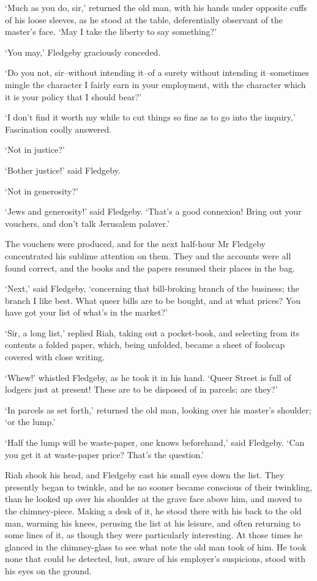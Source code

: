 ‘Much as you do, sir,’ returned the old man, with his hands under
opposite cuffs of his loose sleeves, as he stood at the table,
deferentially observant of the master’s face. ‘May I take the liberty to
say something?’

‘You may,’ Fledgeby graciously conceded.

‘Do you not, sir--without intending it--of a surety without intending
it--sometimes mingle the character I fairly earn in your employment,
with the character which it is your policy that I should bear?’

‘I don’t find it worth my while to cut things so fine as to go into the
inquiry,’ Fascination coolly answered.

‘Not in justice?’

‘Bother justice!’ said Fledgeby.

‘Not in generosity?’

‘Jews and generosity!’ said Fledgeby. ‘That’s a good connexion! Bring
out your vouchers, and don’t talk Jerusalem palaver.’

The vouchers were produced, and for the next half-hour Mr Fledgeby
concentrated his sublime attention on them. They and the accounts were
all found correct, and the books and the papers resumed their places in
the bag.

‘Next,’ said Fledgeby, ‘concerning that bill-broking branch of the
business; the branch I like best. What queer bills are to be bought, and
at what prices? You have got your list of what’s in the market?’

‘Sir, a long list,’ replied Riah, taking out a pocket-book, and
selecting from its contents a folded paper, which, being unfolded,
became a sheet of foolscap covered with close writing.

‘Whew!’ whistled Fledgeby, as he took it in his hand. ‘Queer Street is
full of lodgers just at present! These are to be disposed of in parcels;
are they?’

‘In parcels as set forth,’ returned the old man, looking over his
master’s shoulder; ‘or the lump.’

‘Half the lump will be waste-paper, one knows beforehand,’ said
Fledgeby. ‘Can you get it at waste-paper price? That’s the question.’

Riah shook his head, and Fledgeby cast his small eyes down the list.
They presently began to twinkle, and he no sooner became conscious of
their twinkling, than he looked up over his shoulder at the grave face
above him, and moved to the chimney-piece. Making a desk of it, he stood
there with his back to the old man, warming his knees, perusing the list
at his leisure, and often returning to some lines of it, as though
they were particularly interesting. At those times he glanced in the
chimney-glass to see what note the old man took of him. He took none
that could be detected, but, aware of his employer’s suspicions, stood
with his eyes on the ground.

